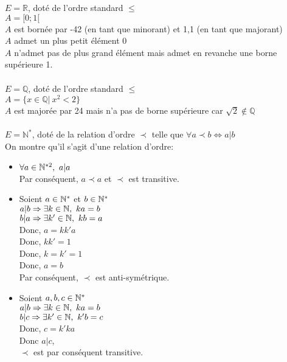 \documentclass[../main.tex]{subfile}
\begin{document}
\begin{ex}
	$\phantom{a}$\\

	$E = \mathbb{R}$, doté de l'ordre standard $\leq$\\
	$A = [0; 1[$\\
	$A$ est bornée par -42 (en tant que minorant) et 1,1 (en tant que majorant)\\
	$A$ admet un plus petit élément 0 \\
	$A$ n'admet pas de plus grand élément mais admet en revanche une borne supérieure 1.\\
	$$\phantom{a}$$

	$E = \mathbb{Q}$, doté de l'ordre standard $\leq$\\
	$A = \{x \in \mathbb{Q} | \ x^2 < 2\}$\\
	$A$ est majorée par 24 mais n'a pas de borne supérieure car $\sqrt{2} \notin \mathbb{Q}$
	$$\phantom{a}$$

	$E = \mathbb{N}^*$, doté de la relation d'ordre $\prec$ telle que $\forall a \prec b \Leftrightarrow a | b$\\
	On montre qu'il s'agit d'une relation d'ordre:\\
	\begin{itemize}
		\item $\forall a \in \NN^{*2}, \ a|a$\\
		Par conséquent, $a \prec a$ et $\prec$ est transitive.

		\item Soient $a \in \mathbb{N}^*$ et $b \in \mathbb{N}^*$\\
		$a|b \Rightarrow \exists k \in \NN, \ ka=b$\\
		$b|a \Rightarrow \exists k' \in \NN, \ kb=a$\\
		Donc, $a = kk'a$\\
		Donc, $kk' = 1$\\
		Donc, $k = k' = 1$\\
		Donc, $a = b$\\
		Par conséquent, $\prec$ est anti-symétrique.

		\item Soient $a, b, c \in \mathbb{N}^{*}$\\
		$a|b \Rightarrow \exists k \in \NN, \ ka=b$\\
		$b|c \Rightarrow \exists k' \in \NN, \ k'b=c$\\
		Donc, $c = k'ka$\\
		Donc $a|c$,\\
		$\prec$ est par conséquent transitive.\\


\end{itemize}
\end{ex}
\end{document}
